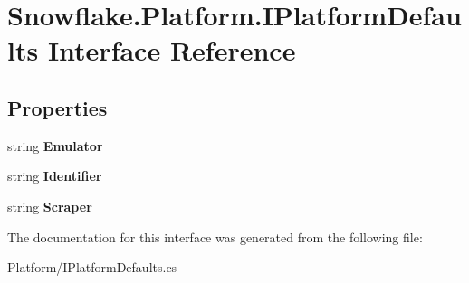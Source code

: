 \hypertarget{interface_snowflake_1_1_platform_1_1_i_platform_defaults}{}\section{Snowflake.\+Platform.\+I\+Platform\+Defaults Interface Reference}
\label{interface_snowflake_1_1_platform_1_1_i_platform_defaults}
\subsection*{Properties}
\begin{DoxyCompactItemize}
\item 
\hypertarget{interface_snowflake_1_1_platform_1_1_i_platform_defaults_abd3603b74dd041c42762d9d76e872a77}{}string {\bfseries Emulator}\label{interface_snowflake_1_1_platform_1_1_i_platform_defaults_abd3603b74dd041c42762d9d76e872a77}

\item 
\hypertarget{interface_snowflake_1_1_platform_1_1_i_platform_defaults_abdf4bdbce92fd8e6426b6f893d22457b}{}string {\bfseries Identifier}\label{interface_snowflake_1_1_platform_1_1_i_platform_defaults_abdf4bdbce92fd8e6426b6f893d22457b}

\item 
\hypertarget{interface_snowflake_1_1_platform_1_1_i_platform_defaults_a5d3e39d4443a13e6ce452efbd409afb0}{}string {\bfseries Scraper}\label{interface_snowflake_1_1_platform_1_1_i_platform_defaults_a5d3e39d4443a13e6ce452efbd409afb0}

\end{DoxyCompactItemize}


The documentation for this interface was generated from the following file\+:\begin{DoxyCompactItemize}
\item 
Platform/I\+Platform\+Defaults.\+cs\end{DoxyCompactItemize}
